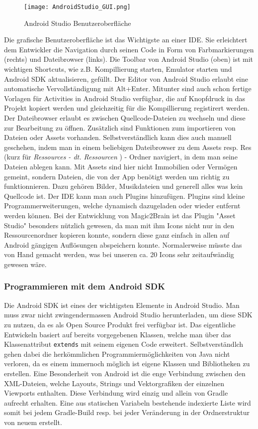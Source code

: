 \begin{figure}[htbp] 
  \centering
     \texttt{[image: AndroidStudio\_GUI.png]}
  \caption{Android Studio Benutzeroberfläche \cite{ASGUI}}
  \label{fig:Android Studio GUI}
\end{figure}
Die grafische Benutzeroberfläche ist das Wichtigste an einer IDE. Sie erleichtert dem Entwickler die Navigation durch seinen Code in Form von Farbmarkierungen (rechts) und Dateibrowser (links).
Die Toolbar von Android Studio (oben) ist mit wichtigen Shortcuts, wie z.B. Kompillierung starten, Emulator starten und Android SDK aktualisieren, gefüllt.
Der Editor von Android Studio erlaubt eine automatische Vervollständigung mit Alt+Enter. Mitunter sind auch schon fertige Vorlagen für Activities in Android Studio verfügbar, die auf Knopfdruck in das Projekt kopiert werden und gleichzeitig für die Kompillierung registirert werden. Der Dateibrowser erlaubt es zwischen Quellcode-Dateien zu wechseln und diese zur Bearbeitung zu öffnen. Zusätzlich sind Funktionen zum importieren von Dateien oder Assets vorhanden. Selbstverständlich kann dies auch manuell geschehen, indem man in einem beliebigen Dateibrowser zu dem Assets resp. Res (kurz für \textit{Ressources - dt. Ressourcen} ) - Ordner navigiert, in dem man seine Dateien ablegen kann. Mit Assets sind hier nicht Immobilien oder Vermögen gemeint, sondern Dateien, die von der App benötigt werden um richtig zu funktionnieren. Dazu gehören Bilder, Musikdateien und generell alles was kein Quellcode ist. Der IDE kann man auch Plugins hinzufügen. Plugins sind kleine Programmerweiterungen, welche dynamisch dazugeladen oder wieder entfernt werden können. Bei der Entwicklung von Magic2Brain ist das Plugin "Asset Studio" besonders nützlich gewesen, da man mit ihm Icons nicht nur in den Ressourcenordner kopieren konnte, sondern diese ganz einfach in allen auf Android gängigen Auflösungen abspeichern konnte. Normalerweise müsste das von Hand gemacht werden, was bei unseren ca. 20 Icons sehr zeitaufwändig gewesen wäre.

\subsubsection{Programmieren mit dem Android SDK}
Die Android SDK ist eines der wichtigsten Elemente in Android Studio. Man muss zwar nicht zwingendermassen Android Studio herunterladen, um diese SDK zu nutzen, da es als Open Source Produkt frei verfügbar ist. Das eigentliche Entwickeln basiert auf bereits vorgegebenen Klassen, welche man über das Klassenattribut \verb|extends|  mit seinem eigenen Code erweitert.
Selbstverständlch gehen dabei die herkömmlichen Programmiermöglichkeiten von Java nicht verloren, da es einem immernoch möglich ist eigene Klassen und Bibliotheken zu erstellen.
Eine Besonderheit von Android ist die enge Verbindung zwischen den XML-Dateien, welche Layouts, Strings und Vektorgrafiken der einzelnen Viewports enthalten.
Diese Verbindung wird einzig und allein von Gradle aufrecht erhalten. Eine aus statischen Variabeln bestehende indexierte Liste wird somit bei jedem Gradle-Build resp. bei jeder Veränderung in der Ordnerstruktur von neuem erstellt.

